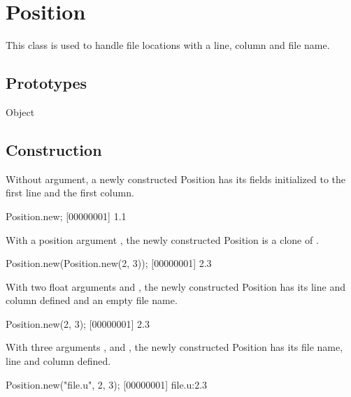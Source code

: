 
\section{Position}

This class is used to handle file locations with a line, column and file
name.

\subsection{Prototypes}
\begin{refObjects}
\item[Object]
\end{refObjects}

\subsection{Construction}

Without argument, a newly constructed Position has its fields initialized to
the first line and the first column.

\begin{urbiscript}[firstnumber=1]
Position.new;
[00000001] 1.1
\end{urbiscript}

With a position argument , the newly constructed Position is a clone
of .

\begin{urbiscript}
Position.new(Position.new(2, 3));
[00000001] 2.3
\end{urbiscript}

With two float arguments  and , the newly constructed
Position has its line and column defined and an empty file name.

\begin{urbiscript}
Position.new(2, 3);
[00000001] 2.3
\end{urbiscript}

With three arguments ,  and , the newly
constructed Position has its file name, line and column defined.

\begin{urbiscript}
Position.new("file.u", 2, 3);
[00000001] file.u:2.3
\end{urbiscript}

